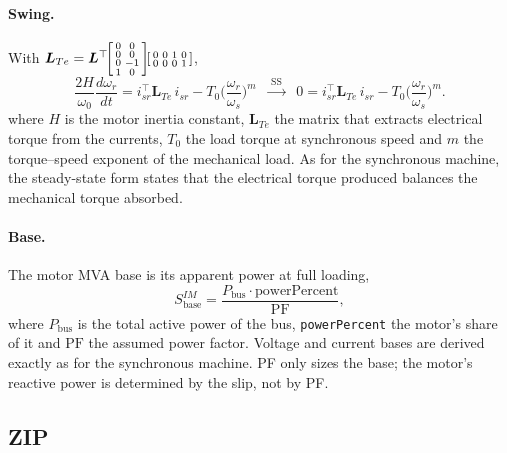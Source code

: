 \documentclass[11pt]{article}
\newcommand{\wnom}{\omega_0}
\newcommand{\wsys}{\omega_s}
\newcommand{\wrot}{\omega_r}
\begin{document}
\paragraph{Swing.}
With
$\bm{L}_{Te} = \bm{L}^\top\!\begin{bsmallmatrix}0&0\\0&0\\0&-1\\1&0\end{bsmallmatrix}\!\begin{bsmallmatrix}0&0&1&0\\0&0&0&1\end{bsmallmatrix}$,
\begin{equation}
  \frac{2H}{\wnom}\frac{d\wrot}{dt} = i_{sr}^\top \bm{L}_{Te}\, i_{sr} - T_0\Big(\frac{\wrot}{\wsys}\Big)^{m}
  \;\;\xrightarrow{\;\text{SS}\;}\;\;
  0 = i_{sr}^\top \bm{L}_{Te}\, i_{sr} - T_0\Big(\frac{\wrot}{\wsys}\Big)^{m}.
\end{equation}
where $H$ is the motor inertia constant, $\bm{L}_{Te}$ the matrix that
extracts electrical torque from the currents, $T_0$ the load torque at
synchronous speed and $m$ the torque--speed exponent of the mechanical
load. As for the synchronous machine, the steady-state form states that the
electrical torque produced balances the mechanical torque absorbed.

\paragraph{Base.}
The motor MVA base is its apparent power at full loading,
\begin{equation}
  S_{\text{base}}^{IM} = \frac{P_{\text{bus}}\cdot\text{powerPercent}}{\mathrm{PF}} ,
\end{equation}
where $P_{\text{bus}}$ is the total active power of the bus,
\texttt{powerPercent} the motor's share of it and $\mathrm{PF}$ the assumed
power factor. Voltage and current bases are derived exactly as for the
synchronous machine. PF only sizes the base; the motor's reactive power is
determined by the slip, not by PF.

\subsection{ZIP}
\end{document}
